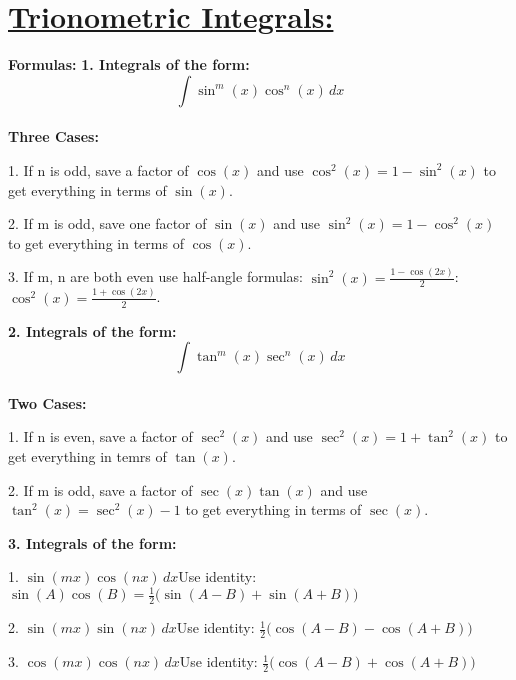 \documentclass[12pt, letterpaper]{article}
\begin{document}
    \section*{\underline{Trionometric Integrals:}}
        \textnormal{\textbf{Formulas:}}
    \textnormal{\newline\newline\textbf{1. Integrals of the form:} \\
        $$\int\sin^m(x)\cos^n(x)\,dx$$ \\
    }
    \textnormal{\textbf{Three Cases:}\\}
    \begin{description}
        \item 1. If n is odd, save a factor of $\cos(x)$ and use $\cos^2(x)=1-\sin^2(x)$ to get everything in terms of $\sin(x)$.
        \item 2. If m is odd, save one factor of $\sin(x)$ and use $\sin^2(x)=1-\cos^2(x)$ to get everything in terms of $\cos(x)$.
        \item 3. If m, n are both even use half-angle formulas: $\sin^2(x)=\frac{1-\cos(2x)}{2}$\hspace{10pt}:\hspace{10pt}$\cos^2(x)=\frac{1+\cos(2x)}{2}$.
    \end{description}
    \textnormal{\textbf{2. Integrals of the form:} \\
        $$\int\tan^m(x)\sec^n(x)\,dx$$ \\
    }
    \textnormal{\textbf{Two Cases:}}
    \begin{description}
        \item 1. If n is even, save a factor of $\sec^2(x)$ and use $\sec^2(x)=1+\tan^2(x)$ to get everything in temrs of $\tan(x)$.
        \item 2. If m is odd, save a factor of $\sec(x)\tan(x)$ and use $\tan^2(x)=\sec^2(x)-1$ to get everything in terms of $\sec(x)$.
    \end{description}
    \textnormal{\textbf{3. Integrals of the form:}}
    \begin{description}
        \item 1. $\sin(mx)\cos(nx)\,dx$\newline Use identity: $\sin(A)\cos(B)=\frac{1}{2}\big(\sin(A-B)+\sin(A+B)\big)$
        \item 2. $\sin(mx)\sin(nx)\,dx$\newline Use identity: $\frac{1}{2}\big(\cos(A-B)-\cos(A+B))$
        \item 3. $\cos(mx)\cos(nx)\,dx$\newline Use identity: $\frac{1}{2}\big(\cos(A-B)+\cos(A+B))$
    \end{description}
    \newpage
\end{document}
